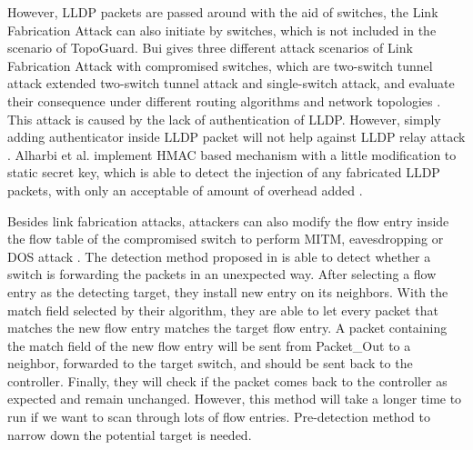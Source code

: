 However, LLDP packets are passed around with the aid of switches, the Link Fabrication Attack can also initiate by switches, which is not included in the scenario of TopoGuard. Bui gives three different attack scenarios of Link Fabrication Attack with compromised switches, which are two-switch tunnel attack extended two-switch tunnel attack and single-switch attack, and evaluate their consequence under different routing algorithms and network topologies \cite{TTB15}. This attack is caused by the lack of authentication of LLDP. However, simply adding authenticator inside LLDP packet will not help against LLDP relay attack \cite{HXWG15}. Alharbi et al. implement HMAC based mechanism with a little modification to static secret key, which is able to detect the injection of any fabricated LLDP packets, with only an acceptable of amount of overhead added \cite{ATPP15}.

Besides link fabrication attacks, attackers can also modify the flow entry inside the flow table of the compromised switch to perform MITM, eavesdropping or DOS attack \cite{AAS14}. The detection method proposed in \cite{CKGL15} is able to detect whether a switch is forwarding the packets in an unexpected way. After selecting a flow entry as the detecting target, they install new entry on its neighbors. With the match field selected by their algorithm, they are able to let every packet that matches the new flow entry matches the target flow entry. A packet containing the match field of the new flow entry will be sent from Packet\_Out to a neighbor, forwarded to the target switch, and should be sent back to the controller. Finally, they will check if the packet comes back to the controller as expected and remain unchanged. However, this method will take a longer time to run if we want to scan through lots of flow entries. Pre-detection method to narrow down the potential target is needed.
